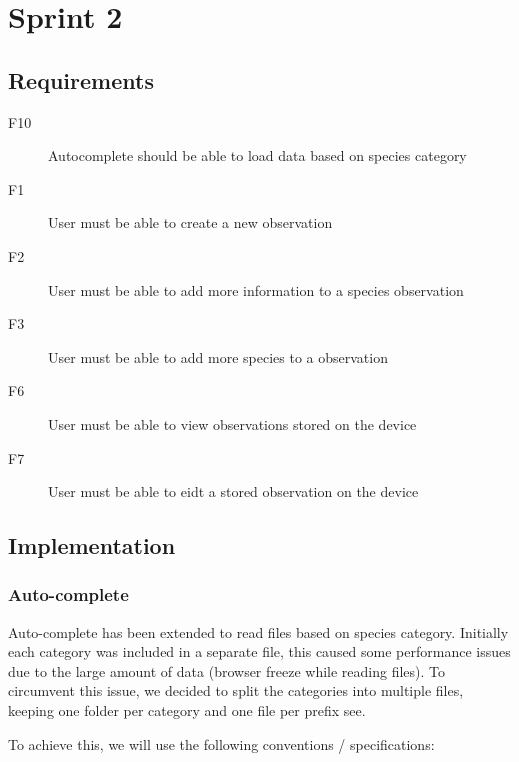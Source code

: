 \section{Sprint 2}

\subsection{Requirements}

\begin{description}
	\item[F10] Autocomplete should be able to load data based on species category
	\item[F1] User must be able to create a new observation 
	\item[F2] User must be able to add more information to a species observation
	\item[F3] User must be able to add more species to a observation
	\item[F6] User must be able to view observations stored on the device
	\item[F7] User must be able to eidt a stored observation on the device
\end{description}

\subsection{Implementation}


	\subsubsection{Auto-complete}

	Auto-complete has been extended to read files based on species category.
	Initially each category was included in a separate file, this caused some
	performance issues due to the large amount of data (browser freeze while reading
	files). To circumvent this issue, we decided to split the categories into
	multiple files, keeping one folder per category and one file per prefix see.

	To achieve this, we will use the following conventions / specifications:

